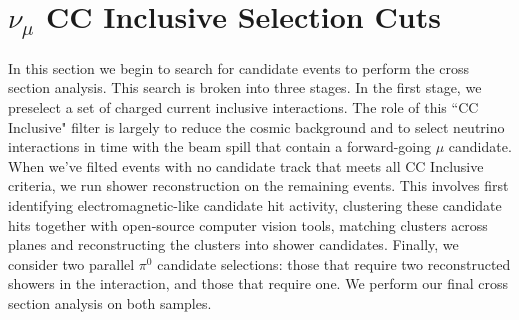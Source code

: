 \clearpage
\section{ $\nu_{\mu}$ CC Inclusive Selection Cuts }

\par In this section we begin to search for candidate events to perform the cross section analysis. This search is broken into three stages.  In the first stage, we preselect a set of charged current inclusive interactions. The role of this ``CC Inclusive" filter is largely to reduce the cosmic background and to select neutrino interactions in time with the beam spill that contain a forward-going $\mu$ candidate.  When we've filted events with no candidate track that meets all CC Inclusive criteria, we run shower reconstruction on the remaining events.  This involves first identifying electromagnetic-like candidate hit activity, clustering these candidate hits together with open-source computer vision tools, matching clusters across planes and reconstructing the clusters into shower candidates.  Finally, we consider two parallel $\pi^0$ candidate selections: those that require two reconstructed showers in the interaction, and those that require one.  We perform our final cross section analysis on both samples.


